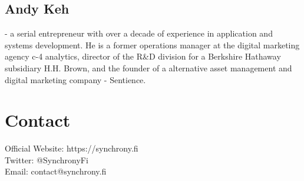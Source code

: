 \documentclass[10pt]{article}
\begin{document}
					\subsection{Andy Keh} - a serial entrepreneur with over a decade of experience in application
					and systems development. He is a former operations manager at the digital
					marketing agency c-4 analytics, director of the R\&D division for a Berkshire
					Hathaway subsidiary H.H. Brown, and the founder of a alternative asset
					management and digital marketing company - Sentience.

					\section{Contact}
					Official Website: https://synchrony.fi\\
					Twitter: @SynchronyFi\\
					Email: contact@synchrony.fi


					

	
\end{document}
